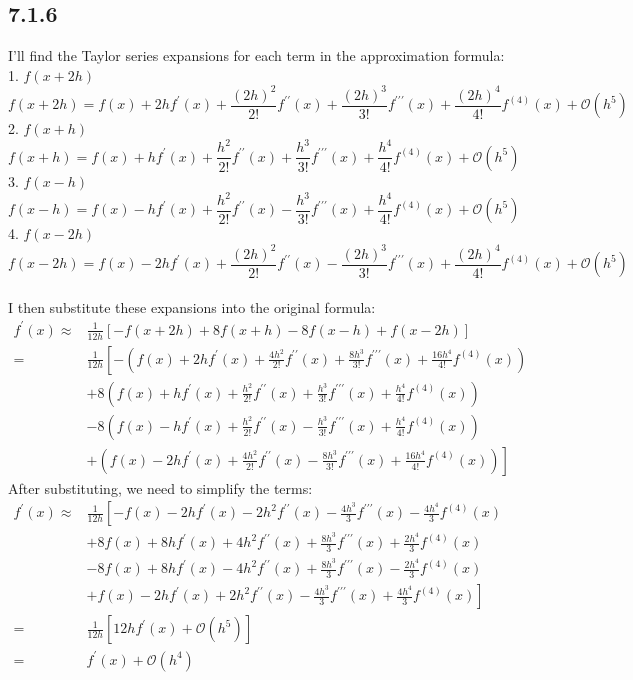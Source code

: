\documentclass[manuscript,screen,review]{acmart}
\begin{document}
\subsection{7.1.6}
I'll find the Taylor series expansions for each term in the approximation formula:
\\
1. $f(x+2 h)$
$$
f(x+2 h)=f(x)+2 h f^{\prime}(x)+\frac{(2 h)^2}{2 !} f^{\prime \prime}(x)+\frac{(2 h)^3}{3 !} f^{\prime \prime \prime}(x)+\frac{(2 h)^4}{4 !} f^{(4)}(x)+\mathcal{O}(h^5)
$$
2. $f(x+h)$
$$
f(x+h)=f(x)+h f^{\prime}(x)+\frac{h^2}{2 !} f^{\prime \prime}(x)+\frac{h^3}{3 !} f^{\prime \prime \prime}(x)+\frac{h^4}{4 !} f^{(4)}(x)+\mathcal{O}\left(h^5\right)
$$
3. $f(x-h)$
$$
f(x-h)=f(x)-h f^{\prime}(x)+\frac{h^2}{2 !} f^{\prime \prime}(x)-\frac{h^3}{3 !} f^{\prime \prime \prime}(x)+\frac{h^4}{4 !} f^{(4)}(x)+\mathcal{O}\left(h^5\right)
$$
4. $f(x-2 h)$
$$
f(x-2 h)=f(x)-2 h f^{\prime}(x)+\frac{(2 h)^2}{2 !} f^{\prime \prime}(x)-\frac{(2 h)^3}{3 !} f^{\prime \prime \prime}(x)+\frac{(2 h)^4}{4 !} f^{(4)}(x)+\mathcal{O}(h^5)
$$
\\
I then substitute these expansions into the original formula:
\\
$\begin{aligned} f^{\prime}(x) \approx & \frac{1}{12 h}[-f(x+2 h)+8 f(x+h)-8 f(x-h)+f(x-2 h)] \\ = & \frac{1}{12 h}\left[-\left(f(x)+2 h f^{\prime}(x)+\frac{4 h^2}{2 !} f^{\prime \prime}(x)+\frac{8 h^3}{3 !} f^{\prime \prime \prime}(x)+\frac{16 h^4}{4 !} f^{(4)}(x)\right)\right. \\ & +8\left(f(x)+h f^{\prime}(x)+\frac{h^2}{2 !} f^{\prime \prime}(x)+\frac{h^3}{3 !} f^{\prime \prime \prime}(x)+\frac{h^4}{4 !} f^{(4)}(x)\right) \\ & -8\left(f(x)-h f^{\prime}(x)+\frac{h^2}{2 !} f^{\prime \prime}(x)-\frac{h^3}{3 !} f^{\prime \prime \prime}(x)+\frac{h^4}{4 !} f^{(4)}(x)\right) \\ & \left.+\left(f(x)-2 h f^{\prime}(x)+\frac{4 h^2}{2 !} f^{\prime \prime}(x)-\frac{8 h^3}{3 !} f^{\prime \prime \prime}(x)+\frac{16 h^4}{4 !} f^{(4)}(x)\right)\right]\end{aligned}$
\\
After substituting, we need to simplify the terms:
\\
$\begin{aligned} f^{\prime}(x) \approx & \frac{1}{12 h}\left[-f(x)-2 h f^{\prime}(x)-2 h^2 f^{\prime \prime}(x)-\frac{4 h^3}{3} f^{\prime \prime \prime}(x)-\frac{4 h^4}{3} f^{(4)}(x)\right. \\ & +8 f(x)+8 h f^{\prime}(x)+4 h^2 f^{\prime \prime}(x)+\frac{8 h^3}{3} f^{\prime \prime \prime}(x)+\frac{2 h^4}{3} f^{(4)}(x) \\ & -8 f(x)+8 h f^{\prime}(x)-4 h^2 f^{\prime \prime}(x)+\frac{8 h^3}{3} f^{\prime \prime \prime}(x)-\frac{2 h^4}{3} f^{(4)}(x) \\ & \left.+f(x)-2 h f^{\prime}(x)+2 h^2 f^{\prime \prime}(x)-\frac{4 h^3}{3} f^{\prime \prime \prime}(x)+\frac{4 h^4}{3} f^{(4)}(x)\right] \\ = & \frac{1}{12 h}\left[12 h f^{\prime}(x)+\mathcal{O}\left(h^5\right)\right] \\ = & f^{\prime}(x)+\mathcal{O}\left(h^4\right)\end{aligned}$
\end{document}
